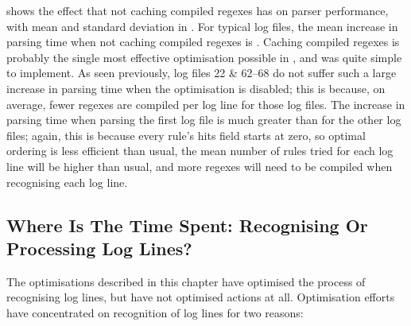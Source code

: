 shows the effect that not caching compiled regexes has on parser
performance, with mean and standard deviation in .  For typical log
files, the mean increase in parsing time when not caching compiled regexes
is .  Caching
compiled regexes is probably the single most effective optimisation
possible in \parsername{}, and was quite simple to implement.  As seen
previously, log files 22 \& 62--68 do not suffer such a large increase in
parsing time when the optimisation is disabled; this is because, on
average, fewer regexes are compiled per log line for those log files.  The
increase in parsing time when parsing the first log file is much greater
than for the other log files; again, this is because every rule's hits
field starts at zero, so optimal ordering is less efficient than usual, the
mean number of rules tried for each log line will be higher than usual, and
more regexes will need to be compiled when recognising each log line.



\FloatBarrier{}

\subsection{Where Is The Time Spent: Recognising Or Processing Log Lines?}

\label{recognising vs processing}

The optimisations described in this chapter have optimised the process of
recognising log lines, but have not optimised actions at all.  Optimisation
efforts have concentrated on recognition of log lines for two reasons:

